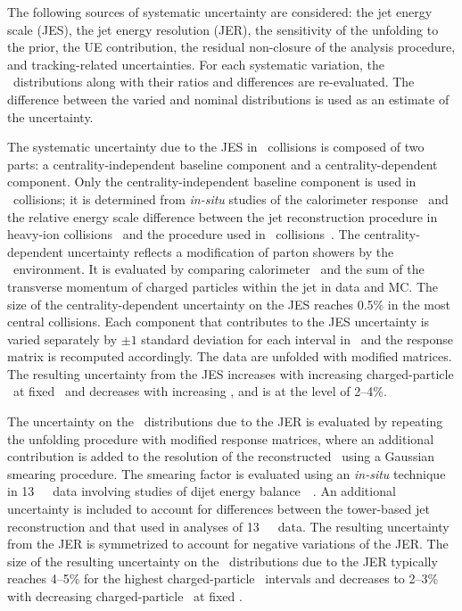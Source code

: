 
The following sources of systematic uncertainty are considered:
the jet energy scale (JES), the jet energy resolution (JER), 
the sensitivity of the  unfolding to the prior, the UE contribution, the residual non-closure of the analysis procedure, and tracking-related uncertainties.
For each systematic variation, the \Dptr\ distributions along with their ratios and differences are re-evaluated. The difference between the varied and nominal distributions is used as an estimate of the uncertainty.

The systematic uncertainty due to the JES in \PbPb\ collisions is composed of two parts: 
a centrality-independent baseline component and a centrality-dependent component. Only the centrality-independent baseline component is used in \pp\ collisions; 
it is determined from \textit{in-situ} studies of the calorimeter
response~\cite{Aad:2011he,HIjesnote,Aaboud:2017jcu} and the relative energy scale difference between the jet reconstruction procedure in heavy-ion collisions~\cite{HIjesnote} and the procedure used in \pp\ collisions~\cite{Aad:2014bia}. The centrality-dependent uncertainty reflects a modification of parton showers by the \PbPb\ environment. It is evaluated by comparing calorimeter \ptjet\ and the sum of the transverse momentum of charged particles within the jet in data and MC. The size of the centrality-dependent uncertainty on the JES reaches 0.5\% in the most central collisions. Each component that contributes to the JES uncertainty is varied separately by $\pm1$ standard deviation for each interval in \ptjet\ and the response matrix is recomputed accordingly. The data are unfolded with modified matrices. The resulting uncertainty from the JES increases with increasing charged-particle \pT\ at fixed \ptjet\ and decreases with increasing \ptjet, and is at the level of 2--4\%.

The uncertainty on the \Dptr\ distributions due to the JER is evaluated by repeating the unfolding procedure with modified response matrices, where an additional contribution is added to the resolution of the reconstructed \ptjet\ using a Gaussian smearing procedure. The smearing factor is evaluated using an \textit{in-situ} technique in 13~\TeV\ \pp\ data involving studies of dijet energy balance~~\cite{Aad:2012ag,JERConfNote}. An additional uncertainty is included to account for differences between the tower-based jet reconstruction and that used in analyses of 13~\TeV\ \pp\ data. The resulting uncertainty from the JER is symmetrized to account for negative variations of the JER.  The size of the resulting uncertainty on the \Dptr\ distributions due to the JER typically reaches 4--5\% for the highest charged-particle \pT\ intervals and decreases to 2--3\% with decreasing charged-particle \pT\ at fixed \ptjet.


